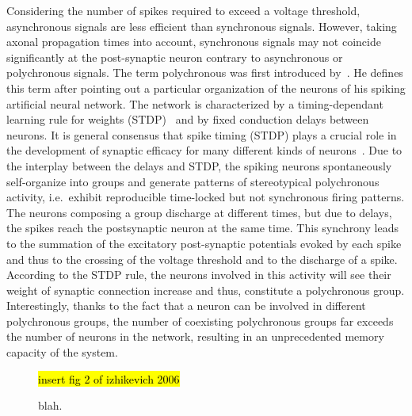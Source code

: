 \documentclass[brainsci, %
               review,submit,pdftex,moreauthors%
               ]{Definitions/mdpi}
\newcommand{\note}[1]{{\sethlcolor{yellow}\hl{#1}}}
\begin{document}
Considering the number of spikes required to exceed a voltage threshold, asynchronous signals are less efficient than synchronous signals. However, taking axonal propagation times into account, synchronous signals may not coincide significantly at the post-synaptic neuron contrary to asynchronous or polychronous signals. The term polychronous was first introduced by~\citet{izhikevich_polychronization_2006}. He defines this term after pointing out a particular organization of the neurons of his spiking artificial neural network. The network is characterized by a timing-dependant learning rule for weights (STDP)~\citep{markram_regulation_1997} and by fixed conduction delays between neurons. It is general consensus that spike timing (STDP) plays a crucial role in the development of synaptic efficacy for many different kinds of neurons~\citep{caporale_spike_2008}. Due to the interplay between the delays and STDP, the spiking neurons spontaneously self-organize into groups and generate patterns of stereotypical polychronous activity, i.e.~exhibit reproducible time-locked but not synchronous firing patterns. The neurons composing a group discharge at different times, but due to delays, the spikes reach the postsynaptic neuron at the same time. This synchrony leads to the summation of the excitatory post-synaptic potentials evoked by each spike and thus to the crossing of the voltage threshold and to the discharge of a spike. According to the STDP rule, the neurons involved in this activity will see their weight of synaptic connection increase and thus, constitute a polychronous group. Interestingly, thanks to the fact that a neuron can be involved in different polychronous groups, the number of coexisting polychronous groups far exceeds the number of neurons in the network, resulting in an unprecedented memory capacity of the system.


\begin{figure}
\centering
\note{insert fig 2 of izhikevich 2006}
\caption{blah.}\label{fig:PG}
\end{figure}
\end{document}
